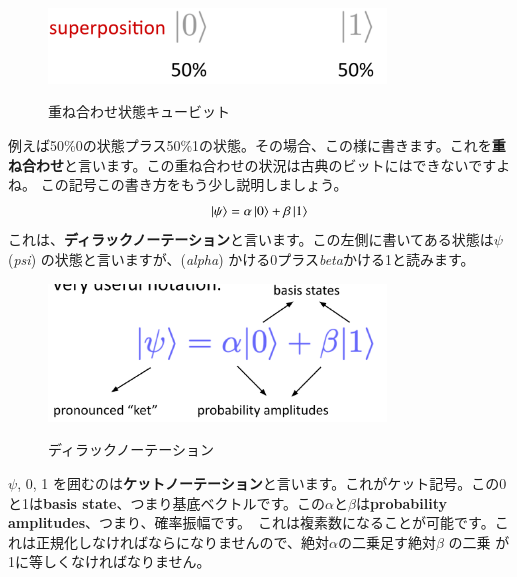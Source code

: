 \begin{figure}[H]
    \centering
    \includegraphics[width=0.8\textwidth]{lesson2/superposition_qubit.pdf}
    \label{fig: 1}
    \begin{center}
        \caption{重ね合わせ状態キュービット}
    \end{center}
\end{figure}
例えば50\%0の状態プラス50\%1の状態。その場合、この様に書きます。これを\textbf{重ね合わせ}と言います。この重ね合わせの状況は古典のビットにはできないですよね。
この記号この書き方をもう少し説明しましょう。
\begin{equation}
\ket{\psi} = \alpha \ket{0} + \beta\ket{1} 
\end{equation}
これは、\textbf{ディラックノーテーション}と言います。この左側に書いてある状態は$\psi$ (\emph{psi}) の状態と言いますが、(\emph{alpha}) かける0プラス\emph{beta}かける1と読みます。
\begin{figure}[H]
    \centering
    \includegraphics[width=0.8\textwidth]{lesson2/dirac_notation.pdf}
    \label{fig: 1}
    \begin{center}
        \caption{ディラックノーテーション}
    \end{center}
\end{figure}
$\psi$, 0, 1 を囲むのは\textbf{ケットノーテーション}と言います。これがケット記号。この0と1は\textbf{basis state}、つまり基底ベクトルです。この$\alpha$と$\beta$は\textbf{probability amplitudes}、つまり、確率振幅です。　これは複素数になることが可能です。これは正規化しなければならになりませんので、絶対$\alpha$の二乗足す絶対$\beta$ の二乗 が1に等しくなければなりません。
